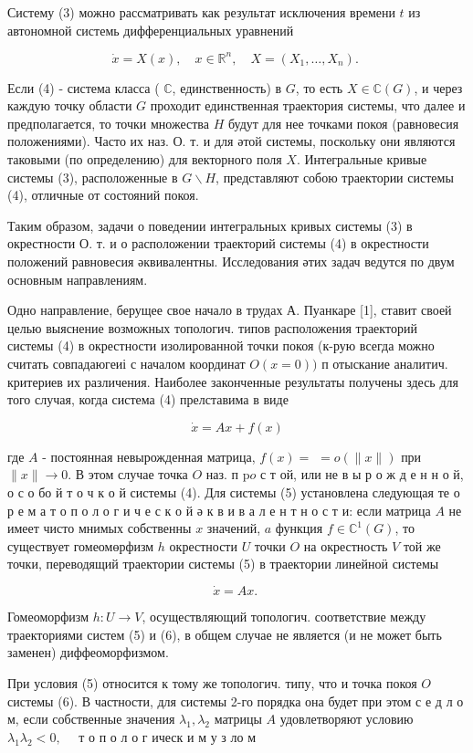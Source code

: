 \documentclass[10pt]{article}
\begin{document}
Систему (3) можно рассматривать как результат исключения времени $t$ из автономной системь дифференциальных уравнений

\[
\dot{x}=X(x), \quad x \in \mathbb{R}^{n}, \quad X=\left(X_{1}, \ldots, X_{n}\right) \text {. }
\]

Если (4) - система класса ( $\mathbb{C}$, единственность) в $G$, то есть $X \in \mathbb{C}(G)$, и через каждую точку области $G$ проходит единственная траектория системы, что далее и предполагается, то точки множества $H$ будут для нее точками покоя (равновесия положениями). Часто их наз. О. т. и для әтой системы, поскольку они являются таковыми (по определению) для векторного поля $X$. Интегральные кривые системы (3), расположенные в $G \backslash H$, представляют собою траектории системы (4), отличные от состояний покоя.

Таким образом, задачи о поведении интегральных кривых системы (3) в окрестности О. т. и о расположении траекторий системы (4) в окрестности положений равновесия әквивалентны. Исследования әтих задач ведутся по двум основным направлениям.

Одно направление, берущее свое начало в трудах А. Пуанкаре [1], ставит своей целью выяснение возможных топологич. типов расположения траекторий системы (4) в окрестности изолированной точки покоя (к-рую всегда можно считать совпадаюгеиі с началом координат $O(x=0))$ п отыскание аналитич. критериев их различения. Наиболее законченные результаты получены здесь для того случая, когда система (4) прелставима в виде

\[
\dot{x}=A x+f(x)
\]

где $A$ - постоянная невырожденная матрица, $f(x)=$ $=o(\|x\|)$ при $\|x\| \rightarrow 0$. В этом случае точка $O$ наз. п $\mathrm{p} o$ с т ой, или не в ы р о ж д е н н о й, о с о бо й т о ч к о й системы (4). Для системы (5) установлена следующая те о р е м а т о п о л о г и ч е с к о й ә к в и в а л е н т н о с т и: если матрица $A$ не имеет чисто мнимых собственны $x$ значений, $a$ функция $f \in \mathbb{C}^{1}(G)$, то существует гомеомөрфизм $h$ окрестности $U$ точки $O$ на окрестность $V$ той же точки, переводящий траектории системы (5) в траектории линейноӥ системы

\[
\dot{x}=A x \text {. }
\]

Гомеоморфизм $h: U \rightarrow V$, осуществляющий топологич. соответствие между траекториями систем (5) и (6), в общем случае не является (и не может быть заменен) диффеоморфизмом.

При условия (5) относится к тому же топологич. типу, что и точка покоя $O$ системы (6). В частности, для системы 2-го порядка она будет при этом с е д л о м, если собственные значения $\lambda_{1}, \lambda_{2}$ матрицы $A$ удовлетворяют условию $\lambda_{1} \lambda_{2}<0, \quad$ т о п о л о г ическ и м у з ло м
\end{document}
